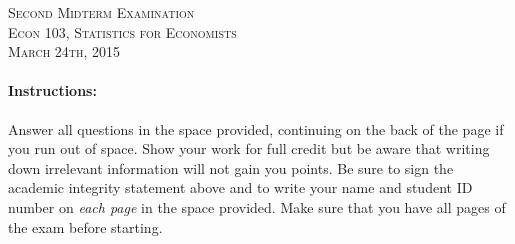 \documentclass[addpoints,12pt]{exam}
\begin{document}
\begin{center}
\textsc{\large Second Midterm Examination\\ \normalsize Econ 103, Statistics for Economists \\ \vspace{0.5em} March 24th, 2015}

\vspace{2em}



\end{center}


\vspace{2em}
\begin{center}
\end{center}
\vspace{0.2in}

\vspace{0.2in}

\noindent{}

\vspace{0.2in}

\noindent{}
\hfill
{}

\vspace{2em}

\begin{center}
  \gradetable[h][questions]
\end{center}

\vspace{2em}

\paragraph{Instructions:} Answer all questions in the space provided, continuing on the back of the page if you run out of space. Show your work for full credit but be aware that writing down irrelevant information will not gain you points. Be sure to sign the academic integrity statement above and to write your name and student ID number on \emph{each page} in the space provided. Make sure that you have all pages of the exam before starting.
\end{document}
